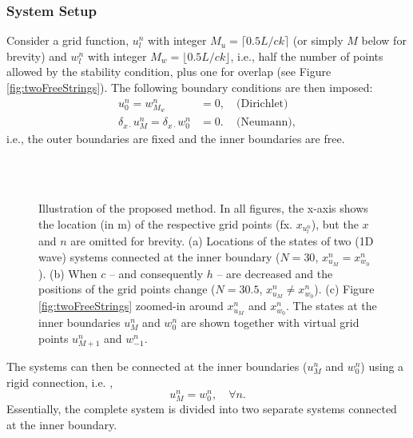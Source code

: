 \subsubsection{System Setup}\label{sec:systSetup}
Consider a grid function, $u_l^n$ with integer $M_u = \lceil 0.5L/ck\rceil $ (or simply $M$ below for brevity)  and $w_l^n$ with integer $M_w = \lfloor 0.5L/ck\rfloor$, i.e., half the number of points allowed by the stability condition, plus one for overlap (see Figure \ref{fig:twoFreeStrings}). The following boundary conditions are then imposed:
\begin{subequations}\label{eq:halfStringBoundaryCond}
    \begin{align}
        u_0^n = w_{M_w}^n &= 0,\quad \text{(Dirichlet)}\label{eq:halfStringBoundaryCondDirichlet}\\
        \delta_{x\cdot}u_M^n = \delta_{x\cdot}w_0^n &= 0.\, \quad\text{(Neumann)}, \label{eq:halfStringBoundaryCondNeumann}
    \end{align}
\end{subequations}
i.e., the outer boundaries are fixed and the inner boundaries are free.
%

\begin{figure}[hp]
    \centering
    \\
    \\
    \caption{Illustration of the proposed method. In all figures, the x-axis shows the location (in m) of the respective grid points (fx. $x_{u_l^n}$), but the $x$ and $n$ are omitted for brevity. (a) Locations of the states of two (1D wave) systems connected at the inner boundary ($N = 30$, $x_{u_M}^n = x_{w_0}^n$). (b) When $c$ -- and consequently $h$ -- are decreased and the positions of the grid points change ($N = 30.5$, $x_{u_M}^n \neq x_{w_0}^n$). (c) Figure \ref{fig:twoFreeStrings} zoomed-in around $x_{u_M}^n$ and $x_{w_0}^n$. The states at the inner boundaries $u_M^n$ and $w_0^n$ are shown together with virtual grid points $u_{M+1}^n$ and $w_{-1}^n$.}
\end{figure}
%
The systems can then be connected at the inner boundaries ($u_M^n$ and $w_0^n$) using a rigid connection, i.e. \SWcomment[(only valid if $x_{u_M}^n = x_{w_0}^n$)],
\begin{equation}\label{eq:rigid}
    u_M^n = w_0^n,\quad \forall n.
\end{equation}
Essentially, the complete system is divided into two separate systems connected at the inner boundary. 

